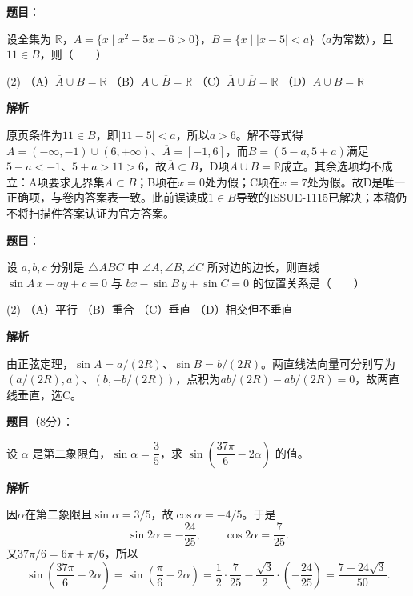 \begin{answer}

\textbf{题目}：

设全集为 $\mathbb R$，$A=\{x\mid x^2-5x-6>0\}$，$B=\{x\mid |x-5|<a\}$（$a$为常数），且 $11\in B$，则\mbox{（　　）}

\begin{gkopts}(2)
\task （A）$\overline A\cup B=\mathbb R$
\task （B）$A\cup\overline B=\mathbb R$
\task （C）$\overline A\cup\overline B=\mathbb R$
\task （D）$A\cup B=\mathbb R$
\end{gkopts}

\textbf{解析}

原页条件为$11\in B$，即$|11-5|<a$，所以$a>6$。解不等式得$A=(-\infty,-1)\cup(6,+\infty)$、$\overline A=[-1,6]$，而$B=(5-a,5+a)$满足$5-a<-1$、$5+a>11>6$，故$\overline A\subset B$，D项$A\cup B=\mathbb R$成立。其余选项均不成立：A项要求无界集$A\subset B$；B项在$x=0$处为假；C项在$x=7$处为假。故D是唯一正确项，与卷内答案表一致。此前误读成$1\in B$导致的ISSUE-1115已解决；本稿仍不将扫描件答案认证为官方答案。


\end{answer}
\begin{answer}

\textbf{题目}：

设 $a,b,c$ 分别是 $\triangle ABC$ 中 $\angle A,\angle B,\angle C$ 所对边的边长，则直线
$\sin A\,x+ay+c=0$ 与 $bx-\sin B\,y+\sin C=0$ 的位置关系是\mbox{（　　）}

\begin{gkopts}(2)
\task （A）平行
\task （B）重合
\task （C）垂直
\task （D）相交但不垂直
\end{gkopts}

\textbf{解析}

由正弦定理，$\sin A=a/(2R)$、$\sin B=b/(2R)$。两直线法向量可分别写为$(a/(2R),a)$、$(b,-b/(2R))$，点积为$ab/(2R)-ab/(2R)=0$，故两直线垂直，选C。


\end{answer}
\begin{answer}

\textbf{题目}（8分）：

设 $\alpha$ 是第二象限角，$\sin\alpha=\dfrac35$，求 $\sin\left(\dfrac{37\pi}{6}-2\alpha\right)$ 的值。

\textbf{解析}

因$\alpha$在第二象限且$\sin\alpha=3/5$，故$\cos\alpha=-4/5$。于是
\nopagebreak[4]
\[
\sin2\alpha=-\frac{24}{25},\qquad \cos2\alpha=\frac7{25}.
\]
又$37\pi/6=6\pi+\pi/6$，所以
\nopagebreak[4]
\[
\sin\left(\frac{37\pi}{6}-2\alpha\right)
=\sin\left(\frac\pi6-2\alpha\right)
=\frac12\cdot\frac7{25}-\frac{\sqrt3}{2}\cdot\left(-\frac{24}{25}\right)
=\frac{7+24\sqrt3}{50}.
\]


\end{answer}
